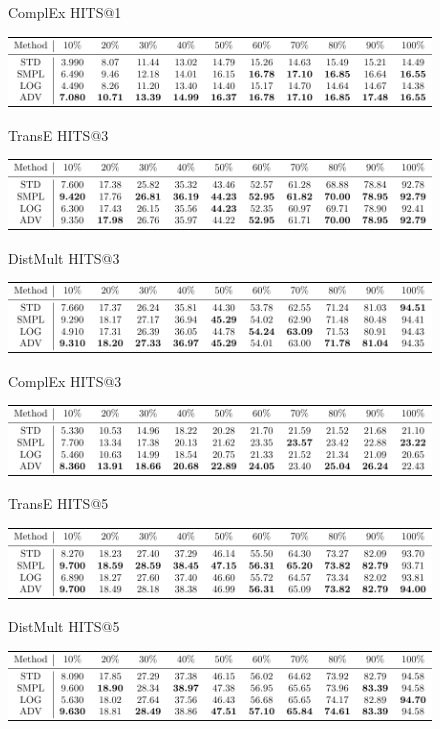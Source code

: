 \documentclass{article}
\begin{document}
\begin{figure}
\caption{ComplEx HITS@1}
\end{figure}\begin{figure}
\includegraphics[]{results_TransE_HITS@3}\\
\caption{TransE HITS@3}
\end{figure}\begin{figure}
\includegraphics[]{results_DistMult_HITS@3}\\
\caption{DistMult HITS@3}
\end{figure}\begin{figure}
\includegraphics[]{results_ComplEx_HITS@3}\\
\caption{ComplEx HITS@3}
\end{figure}\begin{figure}
\includegraphics[]{results_TransE_HITS@5}\\
\caption{TransE HITS@5}
\end{figure}\begin{figure}
\includegraphics[]{results_DistMult_HITS@5}\\
\caption{DistMult HITS@5}
\end{figure}\begin{figure}
\includegraphics[]{results_ComplEx_HITS@5}\\

\end{figure}
\end{document}
